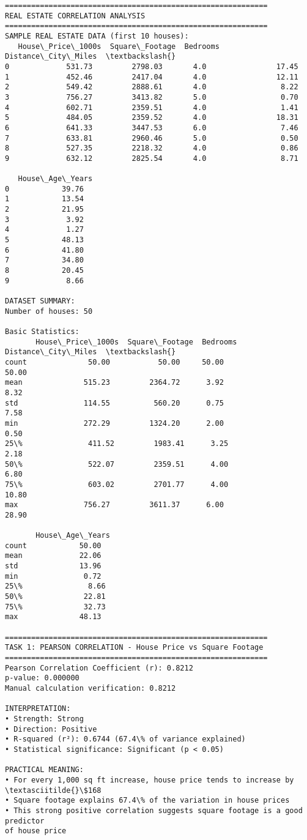 \documentclass[11pt]{article}
\begin{document}
    \begin{Verbatim}[commandchars=\\\{\}]
============================================================
REAL ESTATE CORRELATION ANALYSIS
============================================================
SAMPLE REAL ESTATE DATA (first 10 houses):
   House\_Price\_1000s  Square\_Footage  Bedrooms  Distance\_City\_Miles  \textbackslash{}
0             531.73         2798.03       4.0                17.45
1             452.46         2417.04       4.0                12.11
2             549.42         2888.61       4.0                 8.22
3             756.27         3413.82       5.0                 0.70
4             602.71         2359.51       4.0                 1.41
5             484.05         2359.52       4.0                18.31
6             641.33         3447.53       6.0                 7.46
7             633.81         2960.46       5.0                 0.50
8             527.35         2218.32       4.0                 0.86
9             632.12         2825.54       4.0                 8.71

   House\_Age\_Years
0            39.76
1            13.54
2            21.95
3             3.92
4             1.27
5            48.13
6            41.80
7            34.80
8            20.45
9             8.66

DATASET SUMMARY:
Number of houses: 50

Basic Statistics:
       House\_Price\_1000s  Square\_Footage  Bedrooms  Distance\_City\_Miles  \textbackslash{}
count              50.00           50.00     50.00                50.00
mean              515.23         2364.72      3.92                 8.32
std               114.55          560.20      0.75                 7.58
min               272.29         1324.20      2.00                 0.50
25\%               411.52         1983.41      3.25                 2.18
50\%               522.07         2359.51      4.00                 6.80
75\%               603.02         2701.77      4.00                10.80
max               756.27         3611.37      6.00                28.90

       House\_Age\_Years
count            50.00
mean             22.06
std              13.96
min               0.72
25\%               8.66
50\%              22.81
75\%              32.73
max              48.13

============================================================
TASK 1: PEARSON CORRELATION - House Price vs Square Footage
============================================================
Pearson Correlation Coefficient (r): 0.8212
p-value: 0.000000
Manual calculation verification: 0.8212

INTERPRETATION:
• Strength: Strong
• Direction: Positive
• R-squared (r²): 0.6744 (67.4\% of variance explained)
• Statistical significance: Significant (p < 0.05)

PRACTICAL MEANING:
• For every 1,000 sq ft increase, house price tends to increase by \textasciitilde{}\$168
• Square footage explains 67.4\% of the variation in house prices
• This strong positive correlation suggests square footage is a good predictor
of house price
    \end{Verbatim}
\end{document}
